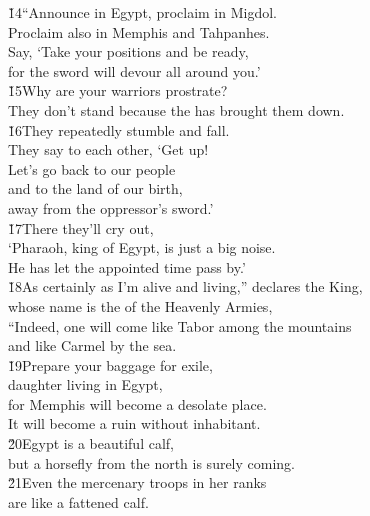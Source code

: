 \begin{poetry}
\poeml \v{14}``Announce in Egypt, proclaim in Migdol. \\
\poemll    Proclaim also in Memphis and Tahpanhes. \\
\poeml Say, `Take your positions and be ready, \\
\poemll    for the sword will devour all around you.' \\
\poeml \v{15}Why are your warriors prostrate? \\
\poemll    They don't stand because the  has brought them down. \\
\poeml \v{16}They repeatedly stumble and fall. \\
\poemll    They say to each other, `Get up! \\
\poeml Let's go back to our people \\
\poemll    and to the land of our birth, \\
\poemlll       away from the oppressor's sword.' \\
\poeml \v{17}There they'll cry out, \\
\poeml `Pharaoh, king of Egypt, is just a big noise. \\
\poemll    He has let the appointed time pass by.' \\
\poeml \v{18}As certainly as I'm alive and living,'' declares the King, \\
\poemll    whose name is the  of the Heavenly Armies, \\
\poeml ``Indeed, one will come like Tabor among the mountains \\
\poemll    and like Carmel by the sea. \\
\poeml \v{19}Prepare your baggage for exile, \\
\poemll    daughter living in Egypt, \\
\poeml for Memphis will become a desolate place. \\
\poemll    It will become a ruin without inhabitant. \\
\poeml \v{20}Egypt is a beautiful calf, \\
\poemll    but a horsefly from the north is surely coming. \\
\poeml \v{21}Even the mercenary troops in her ranks \\
\poemll    are like a fattened calf. \\

\end{poetry}
